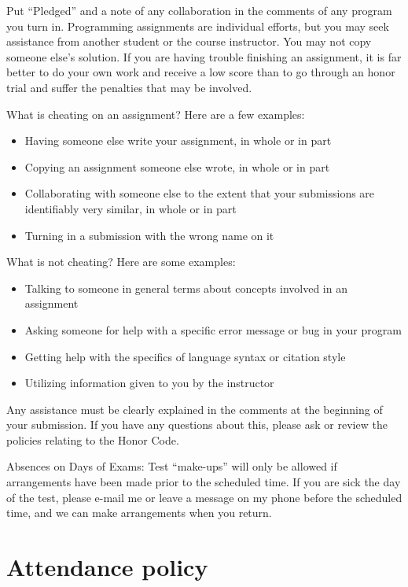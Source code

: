 \documentclass[11pt]{article}
\begin{document}
Put “Pledged” and a note of any collaboration in the comments of any
program you turn in. Programming assignments are individual efforts,
but you may seek assistance from another student or the course
instructor.  You may not copy someone else’s solution. If you are
having trouble finishing an assignment, it is far better to do your
own work and receive a low score than to go through an honor trial and
suffer the penalties that may be involved.

What is cheating on an assignment? Here are a few examples:

\begin{itemize}
\item Having someone else write your assignment, in whole or in part
\item Copying an assignment someone else wrote, in whole or in part
\item Collaborating with someone else to the extent that your
submissions are identifiably very similar, in whole or in part
\item Turning in a submission with the wrong name on it
\end{itemize}

What is not cheating?  Here are some examples:
\begin{itemize}
\item Talking to someone in general terms about concepts involved in an
assignment
\item Asking someone for help with a specific error message or bug in
your program
\item Getting help with the specifics of language syntax or citation
style
\item Utilizing information given to you by the instructor
\end{itemize}

Any assistance must be clearly explained in the comments at the
beginning of your submission.  If you have any questions about this,
please ask or review the policies relating to the Honor Code.

Absences on Days of Exams: Test “make-ups” will only be allowed if
arrangements have been made prior to the scheduled time.  If you are
sick the day of the test, please e-mail me or leave a message on my
phone before the scheduled time, and we can make arrangements when
you return.

\section{Attendance policy}
\label{sec:org55c94c5}
\end{document}

